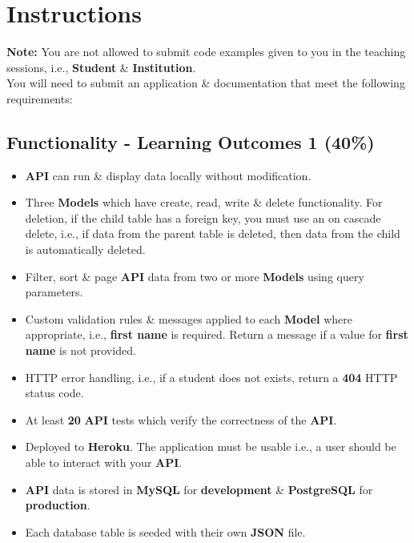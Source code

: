 \documentclass{article}
\begin{document}
\newpage

\section*{Instructions}
\textbf{Note:} You are not allowed to submit code examples given to you in the teaching sessions, i.e., \textbf{Student} \& \textbf{Institution}. \\

You will need to submit an application \& documentation that meet the following requirements:

\subsection*{Functionality - Learning Outcomes 1 (40\%)}
\begin{itemize}
	\item \textbf{API} can run \& display data locally without modification.
	\item Three \textbf{Models} which have create, read, write \& delete functionality. For deletion, if the child table has a foreign key, you must use an on cascade delete, i.e., if data from the parent table is deleted, then data from the child is automatically deleted.
	\item Filter, sort \& page \textbf{API} data from two or more \textbf{Models} using query parameters.
	\item Custom validation rules \& messages applied to each \textbf{Model} where appropriate, i.e., \textbf{first name }is required. Return a message if a value for \textbf{first name} is not provided.
	\item HTTP error handling, i.e., if a student does not exists, return a \textbf{404} HTTP status code.
	\item At least \textbf{20} \textbf{API} tests which verify the correctness of the \textbf{API}.
	\item Deployed to \textbf{Heroku}. The application must be usable i.e., a user should be able to interact with your \textbf{API}.
	\item \textbf{API} data is stored in \textbf{MySQL} for \textbf{development} \& \textbf{PostgreSQL} for \textbf{production}.
	\item Each database table is seeded with their own \textbf{JSON} file.
\end{itemize}
\end{document}

